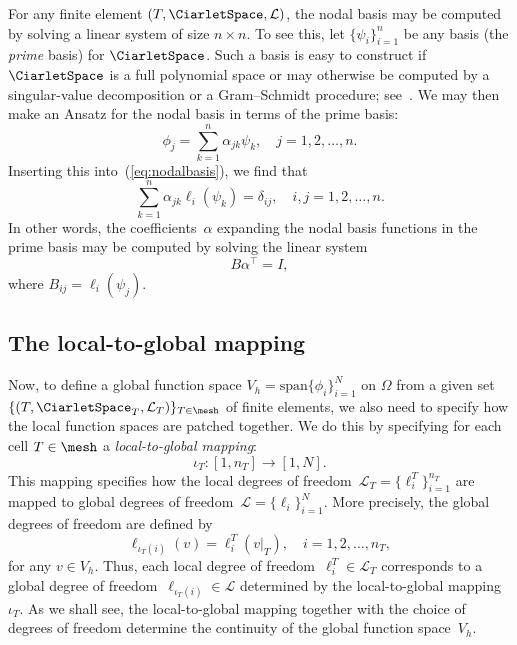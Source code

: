 For any finite element $(T, \CiarletSpace, \mathcal{L})$, the nodal
basis may be computed by solving a linear system of size $n \times
n$. To see this, let $\{\psi_i\}_{i=1}^{n}$ be any basis (the
\emph{prime} basis) for $\CiarletSpace$. Such a basis is easy to
construct if $\CiarletSpace$ is a full polynomial space or may
otherwise be computed by a singular-value decomposition or a
Gram--Schmidt procedure; see~\citet{Kirby2004}. We may then make an
Ansatz for the nodal basis in terms of the prime basis:
\begin{equation}
  \phi_j = \sum_{k=1}^{n} \alpha_{jk} \psi_k, \quad j = 1,2,\ldots,n.
\end{equation}
Inserting this into~(\ref{eq:nodalbasis}), we find that
\begin{equation}
  \sum_{k=1}^{n} \alpha_{jk} \ell_i(\psi_k) = \delta_{ij}, \quad i, j = 1,2,\ldots,n.
\end{equation}
In other words, the coefficients~$\alpha$ expanding the nodal basis
functions in the prime basis may be computed by solving the linear
system
\begin{equation}
  B \alpha^{\top} = I,
\end{equation}
where $B_{ij} = \ell_i(\psi_j)$.

\subsection{The local-to-global mapping}

Now, to define a global function space $V_h = \mathrm{span}
\{\phi_i\}_{i=1}^N$ on $\Omega$ from a given set $\{(T,
\CiarletSpace_T,\mathcal{L}_T)\}_{T\in\mesh}$ of finite elements, we
also need to specify how the local function spaces are patched
together. We do this by specifying for each cell $T \in \mesh$ a
\emph{local-to-global mapping}:
\begin{equation}
  \iota_T : [1, n_T] \rightarrow [1, N].
\end{equation}
This mapping specifies how the local degrees of freedom~$\mathcal{L}_T =
\{\ell_i^T\}_{i=1}^{n_T}$ are mapped to global degrees of
freedom~$\mathcal{L} = \{\ell_i\}_{i=1}^N$. More precisely, the global
degrees of freedom are defined by
\begin{equation} \label{eq:nodemapping}
  \ell_{\iota_T(i)}(v) = \ell^T_i(v|_T), \quad i = 1,2,\ldots,n_T,
\end{equation}
for any $v\in V_h$. Thus, each local degree of freedom~$\ell^T_i \in
\mathcal{L}_T$ corresponds to a global degree of
freedom~$\ell_{\iota_T(i)} \in \mathcal{L}$ determined by the
local-to-global mapping $\iota_T$. As we shall see, the
local-to-global mapping together with the choice of degrees of freedom
determine the continuity of the global function space~$V_h$.

